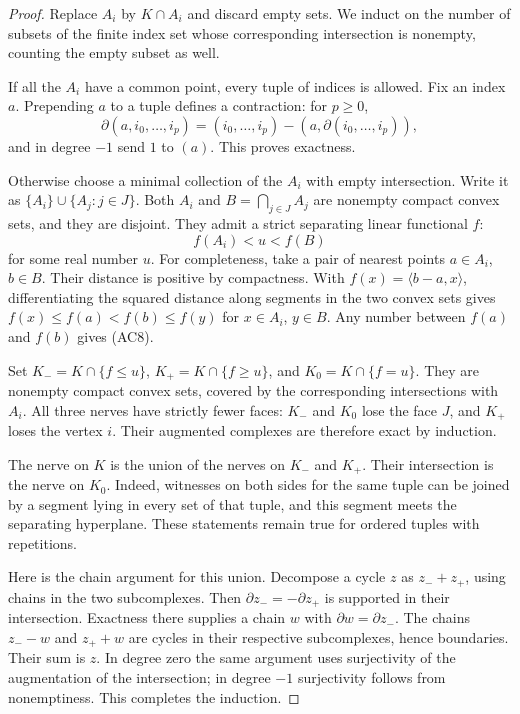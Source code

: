 \begin{proof}
Replace $A_i$ by $K\cap A_i$ and discard empty sets.
We induct on the number of subsets of the finite index set
whose corresponding intersection is nonempty, counting the
empty subset as well.

If all the $A_i$ have a common point, every tuple of indices
is allowed.  Fix an index $a$.  Prepending $a$ to a tuple
defines a contraction: for $p\ge0$,
\[
       \partial(a,i_0,\ldots,i_p)
          =(i_0,\ldots,i_p)-(a,\partial(i_0,\ldots,i_p)),
\]
and in degree $-1$ send $1$ to $(a)$.  This proves exactness.

Otherwise choose a minimal collection of the $A_i$ with
empty intersection.  Write it as $\{A_i\}\cup\{A_j:j\in J\}$.
Both $A_i$ and $B=\bigcap_{j\in J}A_j$ are nonempty compact
convex sets, and they are disjoint.
They admit a strict separating linear functional $f$:
\[
                         f(A_i)<u<f(B)
                         \tag{AC8}
\]
for some real number $u$.
For completeness, take a pair of nearest points $a\in A_i$,
$b\in B$.  Their distance is positive by compactness.
With $f(x)=\langle b-a,x\rangle$, differentiating the squared
distance along segments in the two convex sets gives
$f(x)\le f(a)<f(b)\le f(y)$ for $x\in A_i$, $y\in B$.
Any number between $f(a)$ and $f(b)$ gives (AC8).

Set $K_-=K\cap\{f\le u\}$, $K_+=K\cap\{f\ge u\}$,
and $K_0=K\cap\{f=u\}$.  They are nonempty compact convex
sets, covered by the corresponding intersections with $A_i$.
All three nerves have strictly fewer faces: $K_-$ and $K_0$
lose the face $J$, and $K_+$ loses the vertex $i$.
Their augmented complexes are therefore exact by induction.

The nerve on $K$ is the union of the nerves on $K_-$ and
$K_+$.  Their intersection is the nerve on $K_0$.
Indeed, witnesses on both sides for the same tuple can be
joined by a segment lying in every set of that tuple, and
this segment meets the separating hyperplane.
These statements remain true for ordered tuples with repetitions.

Here is the chain argument for this union.  Decompose a cycle
$z$ as $z_-+z_+$, using chains in the two subcomplexes.
Then $\partial z_-=-\partial z_+$ is supported in their
intersection.  Exactness there supplies a chain $w$ with
$\partial w=\partial z_-$.  The chains $z_--w$ and $z_++w$
are cycles in their respective subcomplexes, hence boundaries.
Their sum is $z$.  In degree zero the same argument uses
surjectivity of the augmentation of the intersection; in
degree $-1$ surjectivity follows from nonemptiness.
This completes the induction.
\end{proof}

